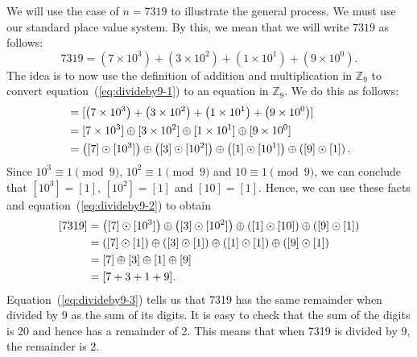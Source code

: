 \setcounter{equation}{0}
We will use the case of  $n = 7319$ to illustrate the general process.  We must use our standard place value system.  By this, we mean that we will write $7319$ as follows:
\begin{equation}
7319 = \left( {7 \times 10^3 } \right) + \left( {3 \times 10^2 } \right) + \left( {1 \times 10^1 } \right) + \left( 9 \times 10^0 \right).  \label{eq:divideby9-1}
\end{equation} 
The idea is to now use the definition of addition and multiplication in  $\mathbb{Z}_9 $
to convert equation~(\ref{eq:divideby9-1}) to an equation in $\mathbb{Z}_9 $.  We do this as follows:
%
\begin{align}
[ {7319} ] &= [ {\left( {7 \times 10^3 } \right) + \left( {3 \times 10^2 }                         \right) + \left( {1 \times 10^1 } \right) + \left( 9 \times 10^0 \right                          )} ]  \notag \\ 
            &= [ {7 \times 10^3 } ] \oplus [ {3 \times 10^2 } ]            \oplus [ {1 \times 10^1 } ] \oplus [ {9 \times 10^0 } ] 
\notag \\ 
            &= \left( {[ 7 ] \odot [ {10^3 } ]} \right) \oplus                          \left( {[ 3 ] \odot [ {10}^2 ]} \right) \oplus         \left( {[ 1 ] \odot [ 10^ 1 ]} \right) \oplus \left( [ 9 ] \odot [ 1 ] \right). \label{eq:divideby9-2}  %
\end{align}
%
Since $10^3  \equiv 1 \pmod 9$, $10^2  \equiv 1 \pmod 9$ and  
$10 \equiv 1 \pmod 9$, we can conclude that $[ 10^3 ] = [ 1 ]$,  
$[ {10^2 } ] = [ 1 ]$  and  $[ {10} ] = [ 1 ]$.  Hence, we can use these facts and  equation~(\ref{eq:divideby9-2}) to obtain
\begin{align} \notag
[ {7319} ] &=\left( {[ 7 ] \odot [ {10^3 } ]} \right) \oplus \left( {[ 3 ] \odot [ {10^2} ]} \right) \oplus \left( {[ 1 ] \odot [ 10 ]} \right) \oplus \left( [ 9 ] \odot [ 1 ] \right) \notag \\ 
                     &= \left( {[ 7 ] \odot [ 1 ]} \right) \oplus \left( {[ 3 ] \odot [ 1 ]} \right) \oplus \left( {[ 1 ] \odot [ 1 ]} \right) \oplus \left( [ 9 ] \odot [ 1 ] \right) \notag \\ 
                     &= [ 7 ] \oplus [ 3 ] \oplus [ 1 ] \oplus [ 9 ] \notag  \\ 
                     &= [ {7 + 3 + 1 + 9} ]. \label{eq:divideby9-3}  %
\end{align}
Equation~(\ref{eq:divideby9-3}) tells us that 7319 has the same remainder when divided by 9 as the sum of its digits.  It is easy to check that the sum of the digits is 20 and hence has a remainder of 2.  This means that when 7319 is divided by 9, the remainder is 2.

